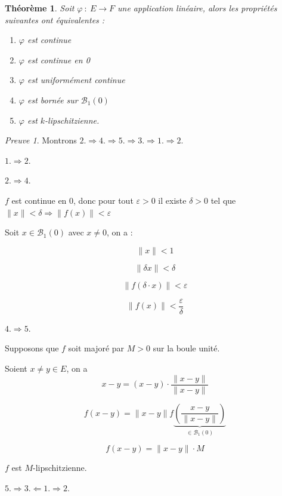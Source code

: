 \documentclass[]{article}
\newtheorem{mythm}{Théorème}
\theoremstyle{remark}
\newtheorem{myproof}{Preuve}
\theoremstyle{definition}
\newcommand{\funcshort}[3]{
#1 ~ : ~ #2 \longrightarrow #3
}
\newenvironment{proofpart}[1]{
	\leavevmode
	
	\noindent
	{\textit{\textbf{\boldmath #1}}}
	
}{
	\checkmark
}
\begin{document}
\begin{mythm}
	Soit $\funcshort{\varphi}{E}{F}$ une application linéaire, alors les propriétés suivantes ont équivalentes :
	
	\begin{enumerate}
		\item $\varphi$ est continue
		\item $\varphi$ est continue en 0
		\item $\varphi$ est uniformément continue
		\item $\varphi$ est bornée sur $\mathcal{B}_1(0)$
		\item $\varphi$ est $k$-lipschitzienne.
	\end{enumerate}
\end{mythm}


\begin{myproof}
	Montrons $2. \Longrightarrow 4. \Longrightarrow 5. \Longrightarrow 3.\Longrightarrow 1. \Longrightarrow 2.$
	
	\begin{proofpart}{$1. \Longrightarrow 2.$}
	\end{proofpart}
	
	\begin{proofpart}{$2. \Longrightarrow 4.$}
		$f$ est continue en 0, donc pour tout $\varepsilon > 0$ il existe $\delta > 0$ tel que $\|x\| < \delta \Longrightarrow \|f(x)\| < \varepsilon$
		
		Soit $x \in \mathcal{B}_1(0)$ avec $x \neq 0$, on a :
		
		$$\|x\| < 1$$

		$$\|\delta x\| < \delta$$
		
		$$\|f(\delta \cdot x)\| < \varepsilon$$
		
		$$\|f(x)\| < \frac{\varepsilon}{\delta}$$
	\end{proofpart}
	
	\begin{proofpart}{$4. \Longrightarrow 5.$}
		Supposons que $f$ soit majoré par $M > 0$ sur la boule unité.
		
		Soient $x \neq y \in E$, on a
		$$x-y = (x-y) \cdot \frac{\|x-y\|}{\|x-y\|}$$
		
		$$f(x-y) = \|x-y\| f\underbrace{\left(\frac{x-y}{\|x-y\|}\right)}_{\in \mathcal{B}_1(0)}$$
		
		$$f(x-y) = \|x-y\| \cdot M$$
		
		$f$ est $M$-lipschitzienne.
	\end{proofpart}
	
	\begin{proofpart}{$5. \Longrightarrow 3. \Longleftarrow 1. \Longrightarrow 2.$}
	\end{proofpart}
\end{myproof}
\end{document}
